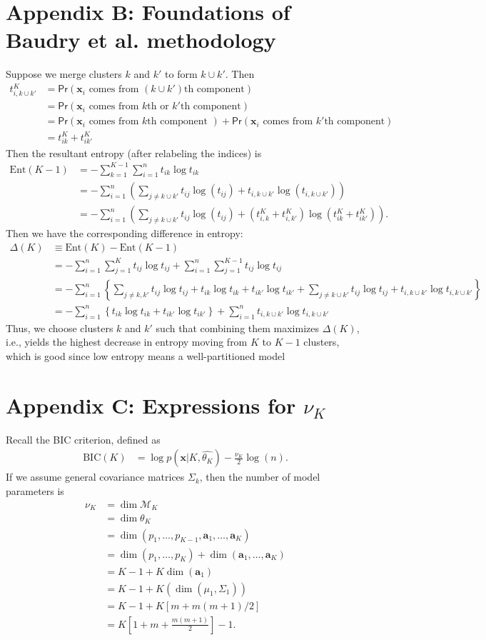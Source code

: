 \documentclass{uwstat572}
\newcommand*\ba{\[ \begin{aligned}}
\newcommand*\ea{\end{aligned} \]}
\newcommand*\estim[1]{\widehat{#1}}
\newcommand*\bolda{\mathbf{a}}
\newcommand*\bx{\mathbf{x}}
\renewcommand\;{\,}
\renewcommand\Pr[1]{ \mathsf{Pr}\left(#1\right) }
\begin{document}
\section*{Appendix B: Foundations of Baudry et al. methodology}
Suppose we merge clusters $k$ and $k'$ to form $k \cup k'$. Then
\ba
t_{i, k \cup k'}^K
	& = \Pr{\bx_i \text{ comes from $(k \cup k')$th component}} \\
	& = \Pr{\bx_i \text{ comes from $k$th or $k'$th component} } \\
	& = \Pr{\bx_i \text{ comes from $k$th component }} + \Pr{\bx_i \text{ comes from $k'$th component} } \\
	& = t_{ik}^K + t_{ik'}^K
\ea
Then the resultant entropy (after relabeling the indices) is
\ba
\text{Ent}(K - 1) & = - \sum_{k=1}^{K - 1} \sum_{i=1}^n t_{ik} \log t_{ik} \\
	& = - \sum_{i=1}^n \left( \sum_{j \ne k \cup k'} t_{ij} \log(t_{ij}) + t_{i,k \cup k'} \log( t_{i,k\cup k'} ) \right) \\
	& = - \sum_{i=1}^n \left( \sum_{j \ne k \cup k'} t_{ij} \log(t_{ij}) + (t_{i,k}^K + t_{i,k'}^K) \log( t_{ik}^K + t_{ik'}^K) \right).
\ea
Then we have the corresponding difference in entropy:
\ba
\Delta(K) 
	& \equiv \text{Ent}(K) - \text{Ent}(K - 1) \\
	& = -  \sum_{i=1}^n \sum_{j=1}^K t_{ij} \log t_{ij} + \sum_{i=1}^n \sum_{j=1}^{K - 1} t_{ij} \log t_{ij} \\
	& = - \sum_{i=1}^n \left\{
			\sum_{j \ne k, k'} t_{ij} \log t_{ij}
			+ t_{ik} \log t_{ik} + t_{ik'} \log t_{ik'}
			+ \sum_{j \ne k \cup k'} t_{ij} \log t_{ij}
			+ t_{i, k\cup k'} \log t_{i, k \cup k'}
		\right\} \\
	& = - \sum_{i=1}^n \left\{ t_{ik} \log t_{ik} + t_{ik'} \log t_{ik'} \right\}
		+ \sum_{i=1}^n t_{i,k\cup k'} \log t_{i, k \cup k'}
\ea
Thus, we choose clusters $k$ and $k'$ such that combining them maximizes $\Delta(K)$, i.e., yields the highest decrease in entropy moving from $K$ to $K - 1$ clusters, which is good since low entropy means a well-partitioned model 

\section*{Appendix C: Expressions for $\nu_K$}
Recall the BIC criterion, defined as
\ba
\text{BIC}(K) 
	& = \log p(\bx | K, \estim{\theta_K})
		- \frac{\nu_K}{2} \log(n).
\ea
If we assume general covariance matrices $\Sigma_k$, then the number of model parameters is
\ba
\nu_K & = \dim \mathcal M_K \\
	& = \dim \theta_K \\
	& = \dim \left( p_1, \dotsc, p_{K - 1}, \bolda_1, \dotsc, \bolda_K \right) \\
	& = \dim \left( p_1, \dotsc, p_K \right)
		+ \dim \left( \bolda_1, \dotsc, \bolda_K \right) \\
	& = K - 1 + K \dim(\bolda_1) \\
	& = K - 1 + K \left(\dim\left(\mu_1, \Sigma_1 \right) \right) \\
	& = K - 1 + K \left[ m + m(m + 1)/2 \right] \\
	& = K\left[1 + m + \frac{m(m + 1)}{2} \right] - 1. 
\ea 
\end{document}
